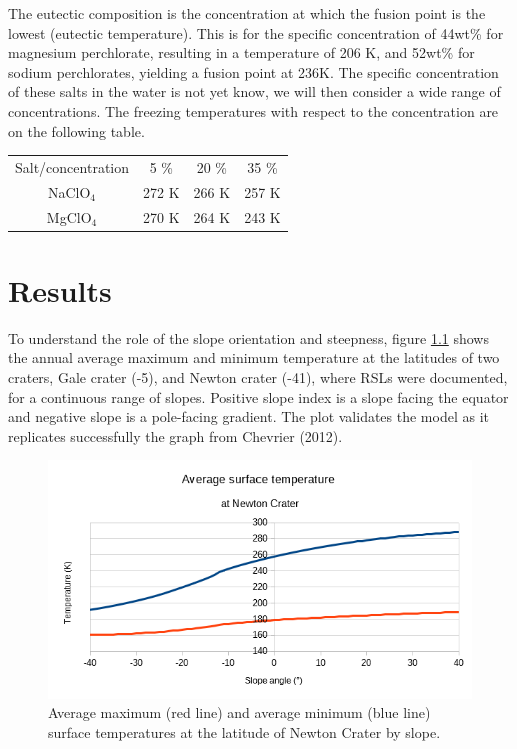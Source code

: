 \documentclass{report}
\begin{document}
    The eutectic composition is the concentration at which the fusion point is the lowest (eutectic temperature). This is for the specific concentration of 44wt\% for magnesium perchlorate, resulting in a temperature of 206 K, and 52wt\% for sodium perchlorates, yielding a fusion point at 236K. 
    The specific concentration of these salts in the water is not yet know, we will then consider a wide range of concentrations. The freezing temperatures with respect to the concentration are on the following table.
    
    \begin{center}

    \begin{tabular}{|c|c|c|c|}
    \hline
     Salt/concentration & 5 \% & 20 \% & 35 \%\\
     NaClO$_4$ & 272 K & 266 K & 257 K \\
     MgClO$_4$ & 270 K & 264 K & 243 K \\
    \hline
    \end{tabular}{}
    \end{center}

    
\chapter{Results}
To understand the role of the slope orientation and steepness, figure \ref{fig:tvslopenewton} shows the annual average maximum and minimum temperature at the latitudes of two craters, Gale crater (-5), and Newton crater (-41), where RSLs were documented, for a continuous range of slopes.
Positive slope index is a slope facing the equator and negative slope is a pole-facing gradient.
The plot validates the model as it replicates successfully the graph from Chevrier (2012). \\
\begin{figure}
    \centering
    \includegraphics[width=.9\textwidth]{graphs/0108-newton-tvslope.png}
    \caption{Average maximum (red line) and average minimum (blue line) surface temperatures at the latitude of Newton Crater by slope.}
    \label{fig:tvslopenewton}
\end{figure}{}
\end{document}
